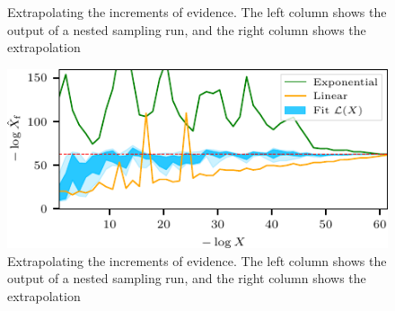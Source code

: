 \documentclass[usenatbib]{mnras}
\begin{document}
\begin{figure}
\begin{adjustbox}{valign=t, scale=0.72}
\end{adjustbox}
\quad
\begin{adjustbox}{valign=t}
\end{adjustbox}
\caption{Extrapolating the increments of evidence. The left column shows the output of a nested sampling run, and the right column shows the extrapolation}
\label{fig:inc_extrapolate}
\end{figure}

\begin{figure}
\includegraphics{figures/inc_predictions.pdf}
\caption{Extrapolating the increments of evidence. The left column shows the output of a nested sampling run, and the right column shows the extrapolation}
\label{fig:inc_predictions}
\end{figure}
\end{document}
